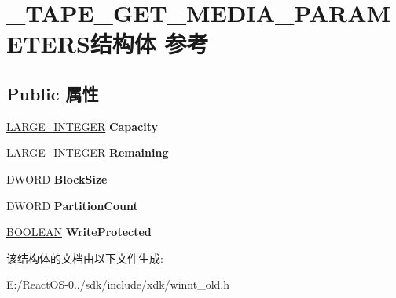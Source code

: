 \hypertarget{struct___t_a_p_e___g_e_t___m_e_d_i_a___p_a_r_a_m_e_t_e_r_s}{}\section{\+\_\+\+T\+A\+P\+E\+\_\+\+G\+E\+T\+\_\+\+M\+E\+D\+I\+A\+\_\+\+P\+A\+R\+A\+M\+E\+T\+E\+R\+S结构体 参考}
\label{struct___t_a_p_e___g_e_t___m_e_d_i_a___p_a_r_a_m_e_t_e_r_s}
\subsection*{Public 属性}
\begin{DoxyCompactItemize}
\item 
\mbox{\label{struct___t_a_p_e___g_e_t___m_e_d_i_a___p_a_r_a_m_e_t_e_r_s_a2dacc6f1fc3392ea2b10b6815df96c19}} 
\hyperlink{union___l_a_r_g_e___i_n_t_e_g_e_r}{L\+A\+R\+G\+E\+\_\+\+I\+N\+T\+E\+G\+ER} {\bfseries Capacity}
\item 
\mbox{\label{struct___t_a_p_e___g_e_t___m_e_d_i_a___p_a_r_a_m_e_t_e_r_s_ac41fce731555bc81061ba5ceebca8bc2}} 
\hyperlink{union___l_a_r_g_e___i_n_t_e_g_e_r}{L\+A\+R\+G\+E\+\_\+\+I\+N\+T\+E\+G\+ER} {\bfseries Remaining}
\item 
\mbox{\label{struct___t_a_p_e___g_e_t___m_e_d_i_a___p_a_r_a_m_e_t_e_r_s_a4a53cd822529608e00689021531135ba}} 
D\+W\+O\+RD {\bfseries Block\+Size}
\item 
\mbox{\label{struct___t_a_p_e___g_e_t___m_e_d_i_a___p_a_r_a_m_e_t_e_r_s_ac997731afd72888aa90c633b813ec42f}} 
D\+W\+O\+RD {\bfseries Partition\+Count}
\item 
\mbox{\label{struct___t_a_p_e___g_e_t___m_e_d_i_a___p_a_r_a_m_e_t_e_r_s_ace16ffacc7f8914a23f32d1569a21325}} 
\hyperlink{_processor_bind_8h_a112e3146cb38b6ee95e64d85842e380a}{B\+O\+O\+L\+E\+AN} {\bfseries Write\+Protected}
\end{DoxyCompactItemize}


该结构体的文档由以下文件生成\+:\begin{DoxyCompactItemize}
\item 
E\+:/\+React\+O\+S-\/0../sdk/include/xdk/winnt\+\_\+old.\+h\end{DoxyCompactItemize}
